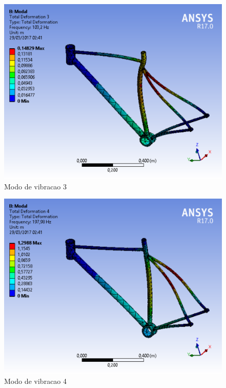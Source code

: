 \graphicspath{{figuras/}}
	\begin{figure}[h!]
	\centering
	\includegraphics[scale=0.80]{modo_de_vibracao_3.png}
	\caption{Modo de vibracao 3}
	\label{img:modo_de_vibracao3}
	\end{figure}	
	
\graphicspath{{figuras/}}
	\begin{figure}[h!]
	\centering
	\includegraphics[scale=0.80]{modo_de_vibracao_4.png}
	\caption{Modo de vibracao 4}
	\label{img:modo_de_vibracao4}
	\end{figure}	
	
